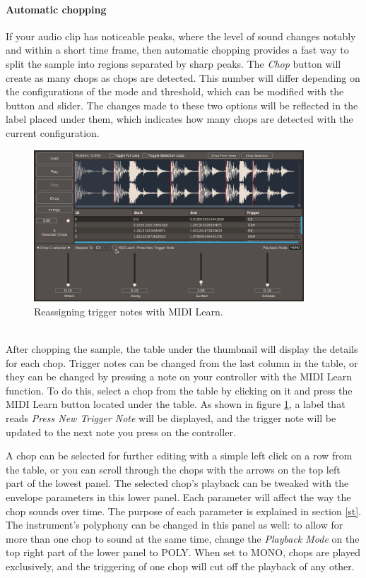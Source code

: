 \documentclass[12pt, a4paper, hidelinks]{article}
\begin{document}
	\paragraph{Automatic chopping\\}
	If your audio clip has noticeable peaks, where the level of sound changes notably and within a short time frame, then automatic chopping provides a fast way to split the sample into regions separated by sharp peaks. The \textit{Chop} button will create as many chops as chops are detected. This number will differ depending on the configurations of the mode and threshold, which can be modified with the button and slider. The changes made to these two options will be reflected in the label placed under them, which indicates how many chops are detected with the current configuration.\par
	
	\begin{figure}[h!]
		\centering
		\includegraphics[width=0.9\textwidth]{u/learn.png}
		\caption{Reassigning trigger notes with MIDI Learn.}
		\label{fig:learn}
	\end{figure}	
	
	~\\
	After chopping the sample, the table under the thumbnail will display the details for each chop. Trigger notes can be changed from the last column in the table, or they can be changed by pressing a note on your controller with the MIDI Learn function. To do this, select a chop from the table by clicking on it and press the MIDI Learn button located under the table. As shown in figure \ref{fig:learn}, a label that reads \textit{Press New Trigger Note} will be displayed, and the trigger note will be updated to the next note you press on the controller. \par
	
	A chop can be selected for further editing with a simple left click on a row from the table, or you can scroll through the chops with the arrows on the top left part of the lowest panel. The selected chop's playback can be tweaked with the envelope parameters in this lower panel. Each parameter will affect the way the chop sounds over time. The purpose of each parameter is explained in section \ref{st}. The instrument's polyphony can be changed in this panel as well: to allow for more than one chop to sound at the same time, change the \textit{Playback Mode} on the top right part of the lower panel to POLY. When set to MONO, chops are played exclusively, and the triggering of one chop will cut off the playback of any other.
	
\end{document}

